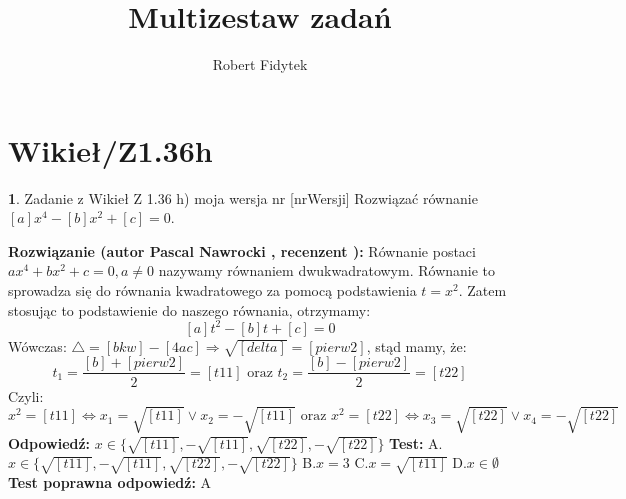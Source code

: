 \documentclass[12pt, a4paper]{article}
\title{Multizestaw zadań}
\author{Robert Fidytek}
\date{}
\theoremstyle{definition} %
\newtheorem{zad}{}
\newcommand{\kategoria}[1]{\section{#1}} %
\newcommand{\zadStart}[1]{\begin{zad}#1\newline} %
\newcommand{\zadStop}{\end{zad}}   %
\newcommand{\rozwStart}[2]{\noindent \textbf{Rozwiązanie (autor #1 , recenzent #2): }\newline} %
\newcommand{\rozwStop}{\newline}                                            %
\newcommand{\odpStart}{\noindent \textbf{Odpowiedź:}\newline}    %
\newcommand{\odpStop}{\newline}                                             %
\newcommand{\testStart}{\noindent \textbf{Test:}\newline} %
\newcommand{\testStop}{\newline} %
\newcommand{\kluczStart}{\noindent \textbf{Test poprawna odpowiedź:}\newline} %
\newcommand{\kluczStop}{\newline} %
\begin{document}
\maketitle


\kategoria{Wikieł/Z1.36h}
\zadStart{Zadanie z Wikieł Z 1.36 h) moja wersja nr [nrWersji]}
Rozwiązać równanie $[a]x^4-[b]x^2+[c]=0$.
\zadStop
\rozwStart{Pascal Nawrocki}{}
Równanie postaci $ax^4+bx^2+c=0, a\neq0$ nazywamy równaniem dwukwadratowym. Równanie to sprowadza się do równania kwadratowego za pomocą podstawienia $t=x^2$. Zatem stosując to podstawienie do naszego równania, otrzymamy: $$ [a]t^2-[b]t+[c]=0$$
Wówczas: $\bigtriangleup=[bkw]-[4ac]\Rightarrow\sqrt{[delta]}=[pierw2]$, stąd mamy, że:
$$t_1=\frac{[b]+[pierw2]}{2}=[t11] \text{ oraz } t_2=\frac{[b]-[pierw2]}{2}=[t22]$$
Czyli:
$$x^2={[t11]}\Leftrightarrow x_1=\sqrt{[t11]} \vee x_2=-\sqrt{[t11]} \text{ oraz } x^2=[t22]\Leftrightarrow x_3=\sqrt{[t22]} \vee x_4=-\sqrt{[t22]}$$
\rozwStop
\odpStart
$x\in\{\sqrt{[t11]},-\sqrt{[t11]},\sqrt{[t22]},-\sqrt{[t22]}\}$
\odpStop
\testStart
A.$x\in\{\sqrt{[t11]},-\sqrt{[t11]},\sqrt{[t22]},-\sqrt{[t22]}\}$
B.$x=3$
C.$x=\sqrt{[t11]}$
D.$x\in \emptyset$
\testStop
\kluczStart
A
\kluczStop
\end{document}
